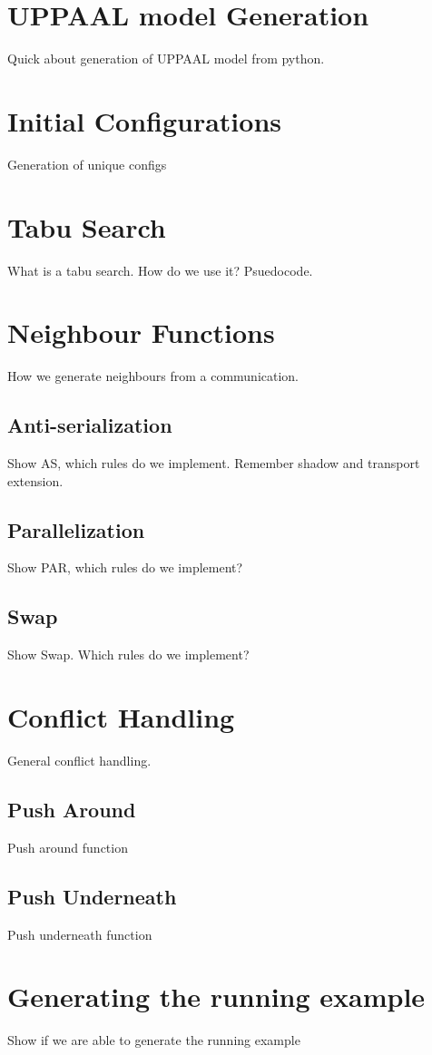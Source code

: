 \section{UPPAAL model Generation}
Quick about generation of UPPAAL model from python.

\section{Initial Configurations}
Generation of unique configs

\section{Tabu Search}
What is a tabu search. How do we use it?
Psuedocode.

\section{Neighbour Functions}
How we generate neighbours from a communication.

\subsection{Anti-serialization}
Show AS, which rules do we implement. Remember shadow and transport extension.

\subsection{Parallelization}
Show PAR, which rules do we implement?

\subsection{Swap}
Show Swap. Which rules do we implement?

\section{Conflict Handling}
General conflict handling.

\subsection{Push Around}
Push around function

\subsection{Push Underneath}
Push underneath function

\section{Generating the running example}
Show if we are able to generate the running example